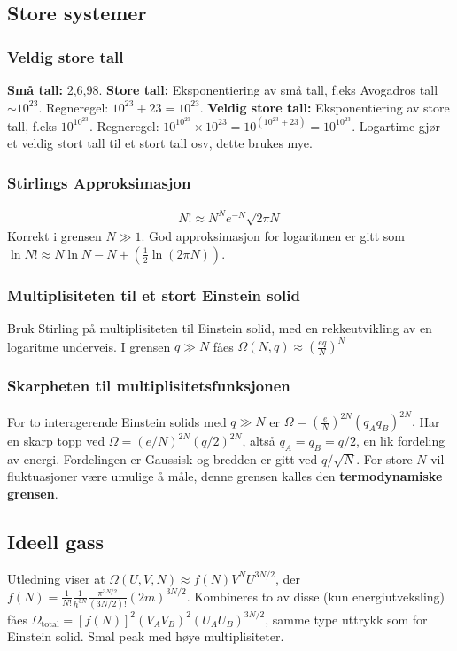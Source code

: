 \documentclass[12pt]{article}
\begin{document}
\subsection{Store systemer}
\subsubsection{Veldig store tall}
\textbf{Små tall:} 2,6,98. \textbf{Store tall:} Eksponentiering av små tall, f.eks
Avogadros tall $\sim 10^{23}$. Regneregel: $10^{23} + 23 = 10^{23}$.
\textbf{Veldig store tall:} Eksponentiering av store tall, f.eks $10^{10^{23}}$.
Regneregel: $10^{10^{23}} \times 10^{23} = 10^{(10^{23} + 23)} = 10^{10^{23}}$.
Logartime gjør et veldig stort tall til et stort tall osv, dette brukes mye.
\subsubsection{Stirlings Approksimasjon}
\begin{align*}
  N! \approx N^N e^{-N}\sqrt{2\pi N}
\end{align*}
Korrekt i grensen $N \gg 1$. God approksimasjon for logaritmen er gitt som $\ln{N!} \approx N \ln N - N + (\frac{1}{2}\ln(2\pi N))$.
\subsubsection{Multiplisiteten til et stort Einstein solid}
Bruk Stirling på multiplisiteten til Einstein solid, med en rekkeutvikling av en
logaritme underveis. I grensen $q \gg N$ fåes
$\Omega(N,q) \approx \left(\frac{eq}{N}\right)^N$
\subsubsection{Skarpheten til multiplisitetsfunksjonen}
For to interagerende Einstein solids med $q \gg N$ er $\Omega = \left(\frac{e}{N}\right)^{2N} (q_A q_B)^{2N}.$
Har en skarp topp ved $\Omega = (e/N)^{2N} (q/2)^{2N}$, altså $q_A = q_B = q/2$,
en lik fordeling av energi. Fordelingen er Gaussisk og bredden er gitt ved $q/\sqrt{N}$.
For store $N$ vil fluktuasjoner være umulige å måle, denne grensen kalles den \textbf{termodynamiske grensen}.
\subsection{Ideell gass}
Utledning viser at $\Omega(U,V,N) \approx f(N) V^N U^{3N/2}$, der $f(N) = \frac{1}{N!} \frac{1}{h^{3N}} \frac{\pi^{3N/2}}{(3N/2)!} (2m)^{3N/2}$.
Kombineres to av disse (kun energiutveksling) fåes $\Omega_\text{total} = [f(N)]^2 (V_A V_B)^2 (U_A U_B)^{3N/2}$,
samme type uttrykk som for Einstein solid. Smal peak med høye multiplisiteter.
\end{document}
